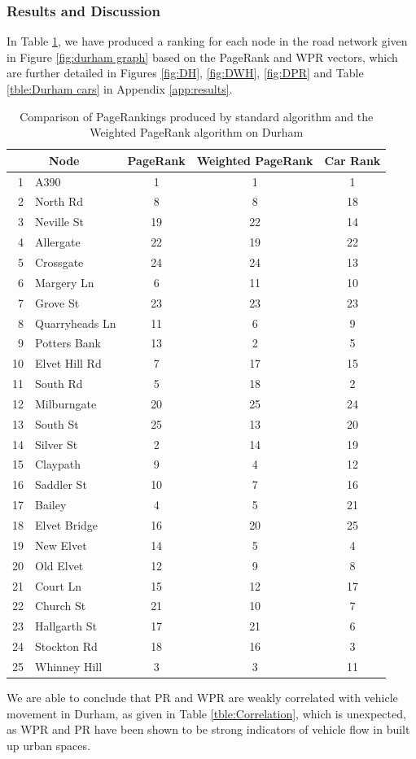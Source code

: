 \documentclass[11pt]{report}
\begin{document}
\subsubsection{Results and Discussion} \label{sec:results}

In Table \ref{tble:Durham comparison}, we have produced a ranking for each node in the road network given in Figure \ref{fig:durham graph} based on the PageRank and WPR vectors, which are further detailed in Figures \ref{fig:DH}, \ref{fig:DWH}, \ref{fig:DPR} and Table \ref{tble:Durham cars} in Appendix \ref{app:results}. 
\begin{table} \caption{Comparison of PageRankings produced by standard algorithm and the Weighted PageRank algorithm on Durham}
 \centering
 \begin{tabular} {r l| c c| c} 
 \multicolumn{2}{c|}{Node}& PageRank & Weighted PageRank & Car Rank\\ [0.5ex] 
 \hline
 1&A390&1&1&1\\
 \rowcolor{yellow}
 2&North Rd&8&8&18\\
 3&Neville St&19&22&14\\
 4&Allergate&22&19&22\\
 5&Crossgate&24&24&13\\
 6&Margery Ln&6&11&10\\
 7&Grove St&23&23&23\\
 8&Quarryheads Ln&11&6&9\\
 9&Potters Bank&13&2&5\\
 10&Elvet Hill Rd&7&17&15\\
 \rowcolor{yellow}
 11&South Rd&5&18&2\\
  \rowcolor{yellow}
 12&Milburngate&20&25&24\\
 13&South St&25&13&20\\
  \rowcolor{yellow}
 14&Silver St&2&14&19\\
 15&Claypath&9&4&12\\
 16&Saddler St&10&7&16\\
  \rowcolor{yellow}
 17&Bailey&4&5&21\\
  \rowcolor{yellow}
 18&Elvet Bridge&16&20&25\\
 19&New Elvet&14&5&4\\
 20&Old Elvet&12&9&8\\
 21&Court Ln&15&12&17\\
 22&Church St&21&10&7\\
  \rowcolor{yellow}
 23&Hallgarth St&17&21&6\\
  \rowcolor{yellow}
 24&Stockton Rd&18&16&3\\
 25&Whinney Hill&3&3&11\\
  \end{tabular}
 \label{tble:Durham comparison}
\end{table}
We are able to conclude that PR and WPR are weakly correlated with vehicle movement in Durham, as given in Table \ref{tble:Correlation}, which is unexpected, as WPR and PR have been shown to be strong indicators of vehicle flow in built up urban spaces.
\end{document}
